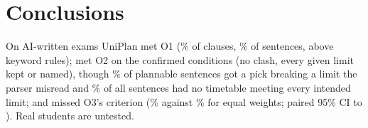 \section{Conclusions}\label{sec:conc}

On AI-written exams UniPlan met O1 (\pRtwoC\% of clauses, \pRtwoS\% of sentences, above keyword rules); met O2 on the confirmed conditions (no clash, every given limit kept or named), though \plViolPct\% of plannable sentences got a pick breaking a limit the parser misread and \plNoFitPct\% of all sentences had no timetable meeting every intended limit; and missed O3's criterion (\rLR\% against \rEq\% for equal weights; paired 95\% CI \rDiffEqLo{} to \rDiffEqHi). Real students are untested.
